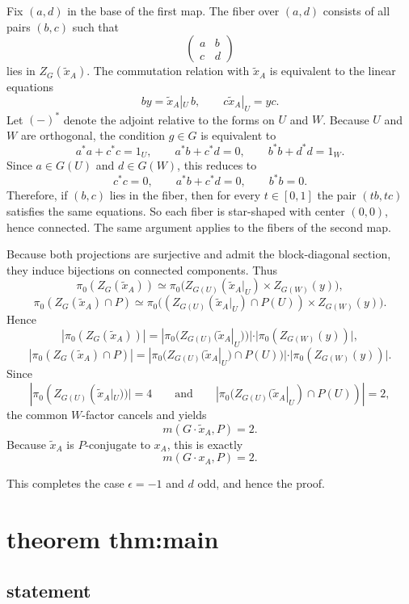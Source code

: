 \documentclass[
  11pt,
]{article}
\begin{document}
Fix \((a,d)\) in the base of the first map. The fiber over \((a,d)\)
consists of all pairs \((b,c)\) such that \[
\begin{pmatrix}
a&b\\
c&d
\end{pmatrix}
\] lies in \(Z_G(\widetilde x_A)\). The commutation relation with
\(\widetilde x_A\) is equivalent to the linear equations \[
by=\widetilde x_A|_U\,b,
\qquad
c\widetilde x_A|_U=yc.
\] Let \((-)^*\) denote the adjoint relative to the forms on \(U\) and
\(W\). Because \(U\) and \(W\) are orthogonal, the condition \(g\in G\)
is equivalent to \[
a^*a+c^*c=1_U,
\qquad
a^*b+c^*d=0,
\qquad
b^*b+d^*d=1_W.
\] Since \(a\in G(U)\) and \(d\in G(W)\), this reduces to \[
c^*c=0,
\qquad
a^*b+c^*d=0,
\qquad
b^*b=0.
\] Therefore, if \((b,c)\) lies in the fiber, then for every
\(t\in[0,1]\) the pair \((tb,tc)\) satisfies the same equations. So each
fiber is star-shaped with center \((0,0)\), hence connected. The same
argument applies to the fibers of the second map.

Because both projections are surjective and admit the block-diagonal
section, they induce bijections on connected components. Thus \[
\pi_0(Z_G(\widetilde x_A))
\simeq
\pi_0\!\bigl(Z_{G(U)}(\widetilde x_A|_U)\times Z_{G(W)}(y)\bigr),
\] \[
\pi_0(Z_G(\widetilde x_A)\cap P)
\simeq
\pi_0\!\bigl((Z_{G(U)}(\widetilde x_A|_U)\cap P(U))\times Z_{G(W)}(y)\bigr).
\] Hence \[
|\pi_0(Z_G(\widetilde x_A))|
=
|\pi_0(Z_{G(U)}(\widetilde x_A|_U))|\cdot |\pi_0(Z_{G(W)}(y))|,
\] \[
|\pi_0(Z_G(\widetilde x_A)\cap P)|
=
|\pi_0(Z_{G(U)}(\widetilde x_A|_U)\cap P(U))|\cdot |\pi_0(Z_{G(W)}(y))|.
\] Since \[
|\pi_0(Z_{G(U)}(\widetilde x_A|_U))|=4
\qquad\text{and}\qquad
|\pi_0(Z_{G(U)}(\widetilde x_A|_U)\cap P(U))|=2,
\] the common \(W\)-factor cancels and yields \[
m(G\cdot \widetilde x_A,P)=2.
\] Because \(\widetilde x_A\) is \(P\)-conjugate to \(x_A\), this is
exactly \[
m(G\cdot x_A,P)=2.
\]

This completes the case \(\epsilon=-1\) and \(d\) odd, and hence the
proof.

\section{theorem thm:main}\label{theorem-thmmain}

\subsection{statement}\label{statement-8}
\end{document}
